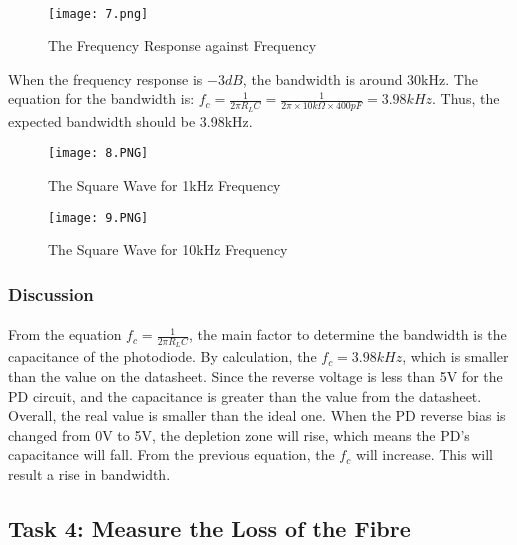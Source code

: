 \documentclass[12pt]{article}
\begin{document}
    \paragraph{}
    \begin{figure}[H]
    \centering
    \texttt{[image: 7.png]}
    \caption{The Frequency Response against Frequency}
    \end{figure}
    When the frequency response is $-3dB$, the bandwidth is around 30kHz. The equation for the bandwidth is: $f_c = \frac{1}{2 \pi R_L C} = \frac{1}{2 \pi \times 10k\Omega \times 400pF} = 3.98kHz$. Thus, the expected bandwidth should be 3.98kHz.
    \begin{figure}[h]
    \centering
    \begin{minipage}[t]{0.45\textwidth}
    \centering
    \texttt{[image: 8.PNG]}
    \caption{The Square Wave for 1kHz Frequency}
    \end{minipage}
    \begin{minipage}[t]{0.45\textwidth}
    \centering
    \texttt{[image: 9.PNG]}
    \caption{The Square Wave for 10kHz Frequency}
    \end{minipage}
    \end{figure}
    
    \subsubsection{Discussion}
    \paragraph{}
    From the equation $f_c = \frac{1}{2 \pi R_L C}$, the main factor to determine the bandwidth is the capacitance of the photodiode. By calculation, the $f_c =3.98kHz$, which is smaller than the value on the datasheet. Since the reverse voltage is less than 5V for the PD circuit, and the capacitance is greater than the value from the datasheet. Overall, the real value is smaller than the ideal one. When the PD reverse bias is changed from 0V to 5V, the depletion zone will rise, which means the PD's capacitance will fall. From the previous equation, the $f_{c}$ will increase. This will result a rise in bandwidth.
    
    
    
    
    \subsection{Task 4: Measure the Loss of the Fibre}
\end{document}
